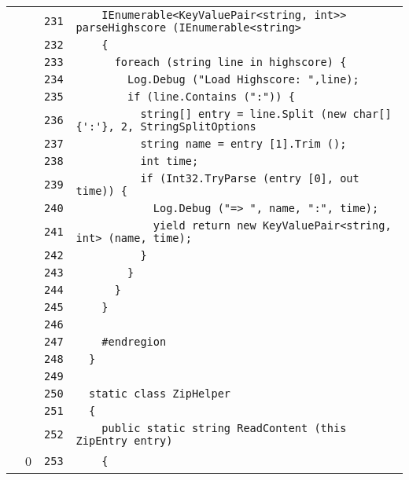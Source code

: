 \documentclass[a4paper,10pt]{article}
\begin{document}
\begin{longtable}[l]{lrrl}
\cellcolor{gray} &  & \verb~231~ & \verb~    IEnumerable<KeyValuePair<string, int>> parseHighscore (IEnumerable<string>~\\
\cellcolor{gray} &  & \verb~232~ & \verb~    {~\\
\cellcolor{gray} &  & \verb~233~ & \verb~      foreach (string line in highscore) {~\\
\cellcolor{gray} &  & \verb~234~ & \verb~        Log.Debug ("Load Highscore: ",line);~\\
\cellcolor{gray} &  & \verb~235~ & \verb~        if (line.Contains (":")) {~\\
\cellcolor{gray} &  & \verb~236~ & \verb~          string[] entry = line.Split (new char[] {':'}, 2, StringSplitOptions~\\
\cellcolor{gray} &  & \verb~237~ & \verb~          string name = entry [1].Trim ();~\\
\cellcolor{gray} &  & \verb~238~ & \verb~          int time;~\\
\cellcolor{gray} &  & \verb~239~ & \verb~          if (Int32.TryParse (entry [0], out time)) {~\\
\cellcolor{gray} &  & \verb~240~ & \verb~            Log.Debug ("=> ", name, ":", time);~\\
\cellcolor{gray} &  & \verb~241~ & \verb~            yield return new KeyValuePair<string, int> (name, time);~\\
\cellcolor{gray} &  & \verb~242~ & \verb~          }~\\
\cellcolor{gray} &  & \verb~243~ & \verb~        }~\\
\cellcolor{gray} &  & \verb~244~ & \verb~      }~\\
\cellcolor{gray} &  & \verb~245~ & \verb~    }~\\
\cellcolor{gray} &  & \verb~246~ & \verb~~\\
\cellcolor{gray} &  & \verb~247~ & \verb~    #endregion~\\
\cellcolor{gray} &  & \verb~248~ & \verb~  }~\\
\cellcolor{gray} &  & \verb~249~ & \verb~~\\
\cellcolor{gray} &  & \verb~250~ & \verb~  static class ZipHelper~\\
\cellcolor{gray} &  & \verb~251~ & \verb~  {~\\
\cellcolor{gray} &  & \verb~252~ & \verb~    public static string ReadContent (this ZipEntry entry)~\\
\cellcolor{red} & 0 & \verb~253~ & \verb~    {~\\

\end{longtable}
\end{document}
